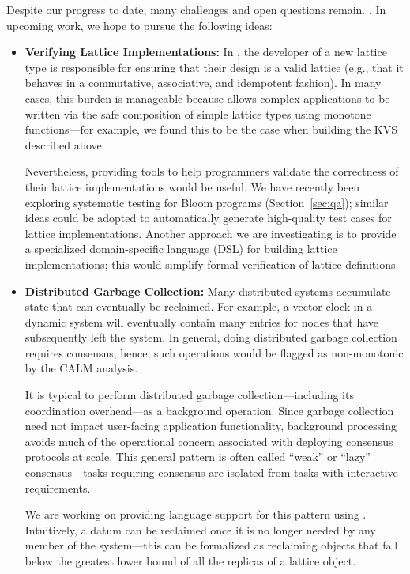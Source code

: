 Despite our progress to date, many challenges and open questions remain.  .  In upcoming work, we hope to pursue the following ideas:
\begin{itemize}
\item \textbf{Verifying Lattice Implementations:} In \blooml, the developer of a
  new lattice type is responsible for ensuring that their design is a valid
  lattice (e.g., that it behaves in a commutative, associative, and idempotent
  fashion). In many cases, this burden is manageable because \blooml allows
  complex applications to be written via the safe composition of simple lattice
  types using monotone functions---for example, we found this to be the case
  when building the KVS described above.

  Nevertheless, providing tools to help programmers validate the correctness
  of their lattice implementations would be useful. We have recently been
  exploring systematic testing for Bloom programs (Section~\ref{sec:qa});
  similar ideas could be adopted to automatically generate high-quality test
  cases for lattice implementations. Another approach we are investigating is to
  provide a specialized domain-specific language (DSL) for building lattice
  implementations; this would simplify formal verification of lattice
  definitions.

\item \textbf{Distributed Garbage Collection:} Many distributed systems
  accumulate state that can eventually be reclaimed. For example, a vector clock
  in a dynamic system will eventually contain many entries for nodes that have
  subsequently left the system. In general, doing distributed garbage collection
  requires consensus; hence, such operations would be flagged as non-monotonic
  by the CALM analysis.

  It is typical to perform distributed garbage collection---including its
  coordination overhead---as a background operation. Since garbage collection
  need not impact user-facing application functionality, background processing
  avoids much of the operational concern associated with deploying consensus
  protocols at scale. This general pattern is often called ``weak'' or ``lazy''
  consensus---tasks requiring consensus are isolated from tasks with interactive
  requirements.

  We are working on providing language support for this pattern using
  \blooml. Intuitively, a datum can be reclaimed once it is no longer needed by
  any member of the system---this can be formalized as reclaiming objects that
  fall below the greatest lower bound of all the replicas of a lattice object.  


\end{itemize}
